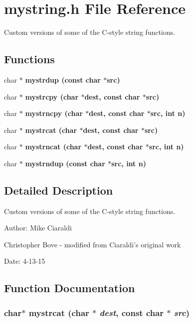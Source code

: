 \section{mystring.h File Reference}
\label{mystring_8h}
Custom versions of some of the C-style string functions. 

\subsection*{Functions}
\begin{CompactItemize}
\item 
char $\ast$ \bf{mystrdup} (const char $\ast$src)
\item 
char $\ast$ \bf{mystrcpy} (char $\ast$dest, const char $\ast$src)
\item 
char $\ast$ \bf{mystrncpy} (char $\ast$dest, const char $\ast$src, int n)
\item 
char $\ast$ \bf{mystrcat} (char $\ast$dest, const char $\ast$src)
\item 
char $\ast$ \bf{mystrncat} (char $\ast$dest, const char $\ast$src, int n)
\item 
char $\ast$ \bf{mystrndup} (const char $\ast$src, int n)
\end{CompactItemize}


\subsection{Detailed Description}
Custom versions of some of the C-style string functions. 

\begin{Desc}
\item[Author:]Mike Ciaraldi 

Christopher Bove - modified from Ciaraldi's original work \end{Desc}
\begin{Desc}
\item[Date:]4-13-15 \end{Desc}


\subsection{Function Documentation}
\subsubsection{\setlength{\rightskip}{0pt plus 5cm}char$\ast$ mystrcat (char $\ast$ {\em dest}, const char $\ast$ {\em src})}\label{mystring_8h_ebc286ca79fc1f0b7ca5d05066cd79a7}


